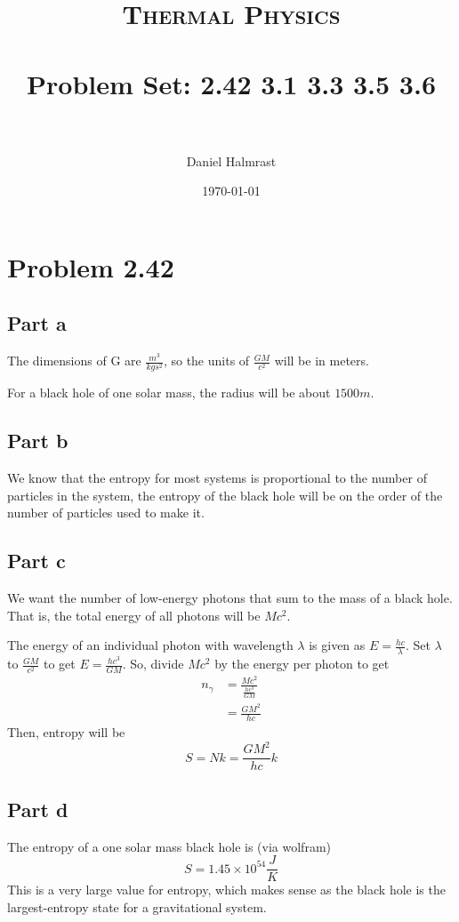 \documentclass[paper=a4, fontsize=11pt]{scrartcl} %
\title{	
\normalfont \normalsize 
\textsc{Thermal Physics} \\ [25pt] %
\horrule{0.5pt} \\[0.4cm] %
\huge Problem Set: 2.42 3.1 3.3 3.5 3.6\\ %
\horrule{2pt} \\[0.5cm] %
}
\author{Daniel Halmrast} %
\date{\normalsize\today} %
\numberwithin{equation}{section} %
\numberwithin{figure}{section} %
\numberwithin{table}{section} %
\begin{document}
\maketitle %


\section*{Problem 2.42}
\subsection*{Part a}
The dimensions of G are $\frac{m^3}{kgs^2}$, so the units of $\frac{GM}{c^2}$ will be in meters.

For a black hole of one solar mass, the radius will be about $1500m$.

\subsection*{Part b}
We know that the entropy for most systems is proportional to the number of particles
in the system, the entropy of the black hole will be on the order of the number of particles
used to make it.

\subsection*{Part c}
We want the number of low-energy photons that sum to the mass of a black hole. That is, the
total energy of all photons will be $Mc^2$.

The energy of an individual photon with wavelength $\lambda$ is given as $E=\frac{hc}{\lambda}$.
Set $\lambda$ to $\frac{GM}{c^2}$ to get $E=\frac{hc^3}{GM}$. So, divide $Mc^2$ by the energy
per photon to get
\[
    \begin{aligned}
        n_{\gamma} &= \frac{Mc^2}{\frac{hc^3}{GM}}\\
                   &= \frac{GM^2}{hc}
    \end{aligned}
\]
Then, entropy will be
\[
    S = Nk = \frac{GM^2}{hc}k
\]

\subsection*{Part d}
The entropy of a one solar mass black hole is (via wolfram)
\[
    S = 1.45\times 10^{54} \frac{J}{K}
    \]
This is a very large value for entropy, which makes sense as the black hole is the
largest-entropy state for a gravitational system.


\end{document}
